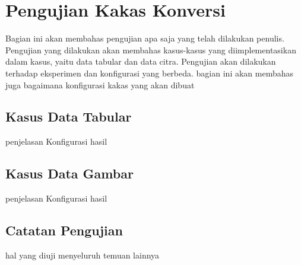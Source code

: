 \section{Pengujian Kakas Konversi}

Bagian ini akan membahas pengujian apa saja yang telah dilakukan penulis.
Pengujian yang dilakukan akan membahas kasus-kasus yang diimplementasikan dalam kasus, yaitu data tabular dan data citra.
Pengujian akan dilakukan terhadap eksperimen dan konfigurasi yang berbeda.
bagian ini akan membahas juga bagaimana konfigurasi kakas yang akan dibuat

\subsection{Kasus Data Tabular}

penjelasan
Konfigurasi
hasil

\subsection{Kasus Data Gambar}

penjelasan
Konfigurasi
hasil

\subsection{Catatan Pengujian}

hal yang diuji menyeluruh
temuan lainnya

